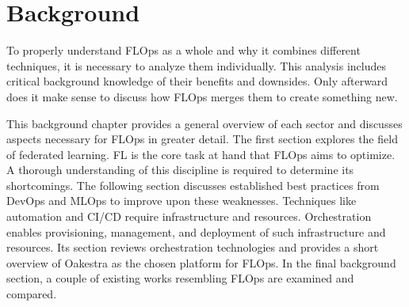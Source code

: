 \chapter{Background}\label{chapter:background}

To properly understand FLOps as a whole and why it combines different techniques, it is necessary to analyze them individually.
This analysis includes critical background knowledge of their benefits and downsides.
Only afterward does it make sense to discuss how FLOps merges them to create something new.

This background chapter provides a general overview of each sector and discusses aspects necessary for FLOps in greater detail.
The first section explores the field of federated learning.
FL is the core task at hand that FLOps aims to optimize.
A thorough understanding of this discipline is required to determine its shortcomings.
The following section discusses established best practices from DevOps and MLOps to improve upon these weaknesses.
Techniques like automation and CI/CD require infrastructure and resources.
Orchestration enables provisioning, management, and deployment of such infrastructure and resources.
Its section reviews orchestration technologies and provides a short overview of Oakestra as the chosen platform for FLOps.
In the final background section, a couple of existing works resembling FLOps are examined and compared.








